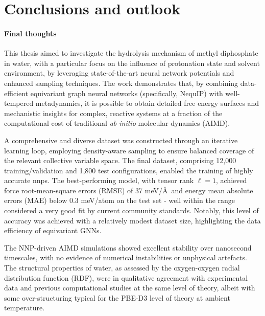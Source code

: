\chapter{Conclusions and outlook}

\subsubsection{Final thoughts}
This thesis aimed to investigate the hydrolysis mechanism of methyl diphosphate in water, with a particular focus on the influence of protonation state and solvent environment, by leveraging state-of-the-art neural network potentials and enhanced sampling techniques. The work demonstrates that, by combining data-efficient equivariant graph neural networks (specifically, NequIP) with well-tempered metadynamics, it is possible to obtain detailed free energy surfaces and mechanistic insights for complex, reactive systems at a fraction of the computational cost of traditional \textit{ab initio} molecular dynamics (AIMD).

A comprehensive and diverse dataset was constructed through an iterative learning loop, employing density-aware sampling to ensure balanced coverage of the relevant collective variable space. The final dataset, comprising 12,000 training/validation and 1,800 test configurations, enabled the training of highly accurate \acp{nnp}. The best-performing model, with tensor rank $\ell=1$, achieved force root-mean-square errors (RMSE) of 37 meV/\AA\ and energy mean absolute errors (MAE) below 0.3 meV/atom on the test set - well within the range considered a very good fit by current community standards. Notably, this level of accuracy was achieved with a relatively modest dataset size, highlighting the data efficiency of equivariant GNNs.

The NNP-driven AIMD simulations showed excellent stability over nanosecond \; timescales, with no evidence of numerical instabilities or unphysical artefacts. The structural properties of water, as assessed by the oxygen-oxygen radial distribution function (RDF), were in qualitative agreement with experimental data and previous computational studies at the same level of theory, albeit with some over-structuring typical for the PBE-D3 level of theory at ambient temperature.

